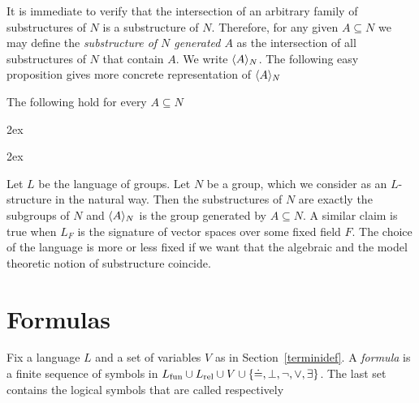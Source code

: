 It is immediate to verify that the intersection of an arbitrary family of substructures of $N$ is a substructure of $N$. Therefore, for any given $A\subseteq N$ we may define the \emph{substructure of $N$ generated $A$\/} as the intersection of all substructures of $N$ that contain $A$. We write \emph{$\langle A\rangle_N$}. The following easy proposition gives more concrete representation of $\langle A\rangle_N$
%
\begin{lemma}\label{strutturagenerata}
The following hold for every $A\subseteq N$



\kern2ex

\kern2ex\QED

\begin{example}\label{ex_substructure}
Let $L$ be the language of groups. Let $N$ be a group, which we consider as an $L$-structure in the natural way. Then the substructures of $N$ are exactly the subgroups of $N$ and $\langle A\rangle_N$ is the group generated by $A\subseteq N$. A similar claim is true when $L_F$ is the signature of vector spaces over some fixed field $F$. The choice of the language is more or less fixed if we want that the algebraic and the model theoretic notion of substructure coincide.\QED
\end{example}
\end{lemma}

\section{Formulas}\label{sintassformule}

Fix a language $L$ and a set of variables $V$ as in Section~\ref{terminidef}. A \emph{formula} is a finite sequence of symbols in $L_{\rm fun}\cup L_{\rm rel}\cup V\cup \{\doteq,\bot,\neg,\vee,\exists\}$. The last set contains the logical symbols that are called respectively



\def\ceq#1#2{\parbox{3ex}{\noindent\emph{#1}\ }\parbox{27ex}{\ \emph{#2}\ }}


